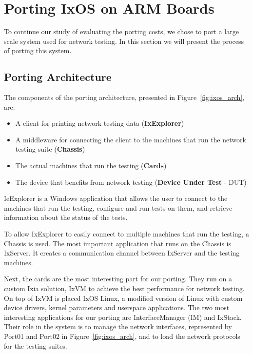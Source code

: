 \section{Porting IxOS on ARM Boards} \label{sec:portingIxos}

To continue our study of evaluating the porting costs, we chose to port a large
scale system used for network testing. In this section we will present the
process of porting this system. 

\subsection{Porting Architecture}

The components of the porting architecture, presented in
Figure~\ref{fig:ixos_arch}, are:
\begin{itemize}
    \item A client for printing network testing data (\textbf{IxExplorer})
    \item A middleware for connecting the client to the machines that run the
    network testing suite (\textbf{Chassis})
    \item The actual machines that run the testing (\textbf{Cards})
    \item The device that benefits from network testing (\textbf{Device Under Test} - DUT)
\end{itemize}

IeExplorer is a Windows application that allows the user to connect to the
machines that run the testing, configure and run tests on them, and retrieve
information about the status of the tests.

To allow IxExplorer to easily connect to multiple machines that run the testing,
a Chassis is used. The most important application that runs on the Chassis is
IxServer. It creates a communication channel between IxServer and the testing
machines. 

Next, the cards are the most interesting part for our porting. They run on a
custom Ixia solution, IxVM to achieve the best performance for network testing. On top
of IxVM is placed IxOS Linux, a modified version of Linux with custom
device drivers, kernel parameters and userspace applications. The two most
interesting applications for our porting are InterfaceManager (IM) and IxStack.
Their role in the system is to manage the network interfaces, represented by
Port01 and Port02 in Figure~\ref{fig:ixos_arch}, and to load the network
protocols for the testing suites.

